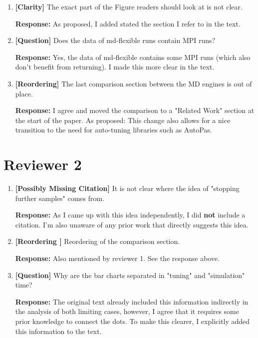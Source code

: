 \documentclass[12pt,a4paper]{article}
\begin{document}
\begin{enumerate}[label=\textbf{Comment \arabic*:}, itemsep=0.8em]
      \item \textbf{[Clarity]} The exact part of the Figure readers should look at is not clear.

            \textbf{Response:} As proposed, I added stated the section I refer to in the text.

      \item \textbf{[Question]} Does the data of md-flexible runs contain MPI runs?

            \textbf{Response:} Yes, the data of md-flexible contains some MPI runs (which also don't benefit from returning). I made this more clear in the text.

      \item \textbf{[Reordering]} The last comparison section between the MD engines is out of place.

            \textbf{Response:} I agree and moved the comparison to a "Related Work" section at the start of the paper. As proposed: This change also allows for a nice transition to the need for auto-tuning libraries such as AutoPas.
\end{enumerate}

\section*{Reviewer 2}
\begin{enumerate}[label=\textbf{Comment \arabic*:}, itemsep=0.8em]
      \item \textbf{[Possibly Missing Citation]} It is not clear where the idea of "stopping further samples" comes from.

            \textbf{Response:} As I came up with this idea independently, I did \textbf{not} include a citation. I'm also unaware of any prior work that directly suggests this idea.

      \item \textbf{[Reordering ]} Reordering of the comparison section.

            \textbf{Response:} Also mentioned by reviewer 1. See the response above.

      \item \textbf{[Question]} Why are the bar charts separated in "tuning" and "simulation" time?

            \textbf{Response:} The original text already included this information indirectly in the analysis of both limiting cases, however, I agree that it requires some prior knowledge to connect the dots.
            To make this clearer, I explicitly added this information to the text.
\end{enumerate}
\end{document}
